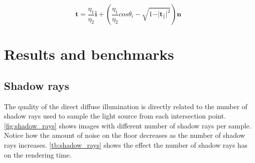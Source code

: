 \documentclass[a4paper, 12pt]{report}
\begin{document}
\begin{equation} \label{eq:refractiontot}
\mathbf{t} = \frac{\eta_1}{\eta_2} \mathbf{i} + (\frac{\eta_1}{\eta_2} cos \theta_i - \sqrt{1 - \vert \mathbf{t}_\| \vert ^2})\mathbf{n}
\end{equation}

\chapter{Results and benchmarks} \label{ch:results}

\section{Shadow rays}
The quality of the direct diffuse illumination is directly related to the number of shadow rays used to sample the light source from each intersection point. 
\autoref{fig:shadow_rays} shows images with different number of shadow rays per sample. 
Notice how the amount of noise on the floor decreases as the number of shadow rays increases. \autoref{tb:shadow_rays} shows the effect the number of shadow rays has on the rendering time.
\end{document}
